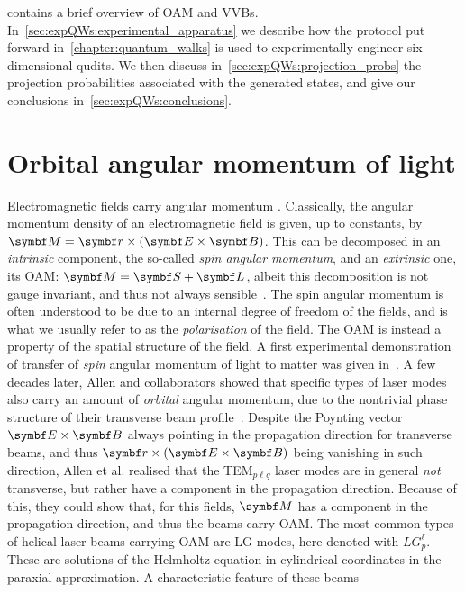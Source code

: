  contains a brief overview of \ac{OAM} and \acp{VVB}.
In~\cref{sec:expQWs:experimental_apparatus} we describe how the protocol put forward in~\cref{chapter:quantum_walks} is used to experimentally engineer six-dimensional qudits. We then discuss in~\cref{sec:expQWs:projection_probs} the projection probabilities associated with the generated states, and give our conclusions in~\cref{sec:expQWs:conclusions}.


\section{Orbital angular momentum of light}
\label{sec:expQWs:OAMintro}

Electromagnetic fields carry angular momentum \cite{jackson1999classical}.
Classically, the angular momentum density of an electromagnetic field is given, up to constants, by
$\bs M =\bs r\times(\bs E\times \bs B)$. This can be decomposed in an \emph{intrinsic} component, the so-called \emph{spin angular momentum}, and an \emph{extrinsic} one, its \ac{OAM}: $\bs M=\bs S+\bs L$, albeit this decomposition is not gauge invariant, and thus not always sensible~\cite{ohanian1986what,cameron2015azimuthal}.
The spin angular momentum is often understood to be due to an internal degree of freedom of the fields, and is what we usually refer to as the \emph{polarisation} of the field. The OAM is instead a property of the spatial structure of the field.
A first experimental demonstration of transfer of \emph{spin} angular momentum of light to matter was given in~\cite{beth1936mechanical}. A few decades later, Allen and collaborators showed that specific types of laser modes also carry an amount of \emph{orbital} angular momentum, due to the nontrivial phase structure of their transverse beam profile~\cite{allen1992orbital}.
Despite the Poynting vector $\bs E\times \bs B$ always pointing in the propagation direction for transverse beams, and thus $\bs r\times(\bs E\times\bs B)$ being vanishing in such direction, Allen et al. realised that the TEM$_{p\ell q}$ laser modes are in general \emph{not} transverse, but rather have a component in the propagation direction. Because of this, they could show that, for this fields, $\bs M$ has a component in the propagation direction, and thus the beams carry OAM.
The most common types of helical laser beams carrying OAM are \ac{LG} modes, here denoted with $LG_p^\ell$. These are solutions of the Helmholtz equation in cylindrical coordinates in the paraxial approximation. A characteristic feature of these beams

